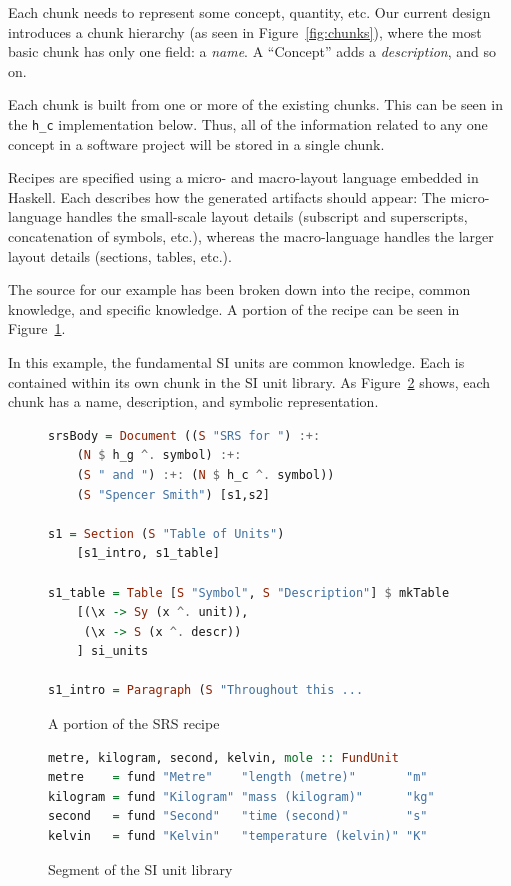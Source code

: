 \documentclass{sig-alternate-05-2015}
\begin{document}
Each chunk needs to represent some concept, quantity, etc. Our current design
introduces a chunk hierarchy (as seen in Figure~\ref{fig:chunks}), where the
most basic chunk has only one field: a \textit{name}. A ``Concept'' adds a
\textit{description}, and so on.

Each chunk is built from one or more of the existing chunks. This can be seen in
the \verb|h_c| implementation below. Thus, all of the information related to any
one concept in a software project will be stored in a single chunk.

Recipes are specified using a micro- and macro-layout language embedded in
Haskell. Each describes how the generated artifacts should appear: The
micro-language handles the small-scale layout details (subscript and
superscripts, concatenation of symbols, etc.), whereas the macro-language
handles the larger layout details (sections, tables, etc.).

The source for our example has been broken down into the recipe, common
knowledge, and specific knowledge. A portion of the recipe can be seen in
Figure~\ref{fig:recipe}.

In this example, the fundamental SI units are common knowledge. Each is
contained within its own chunk in the SI unit library. As
Figure~\ref{fig:know_common} shows, each chunk has a name, description, and
symbolic representation.

\begin{figure}
\begin{lstlisting}[language=Haskell, frame=single, showstringspaces=false, basicstyle=\tiny]
srsBody = Document ((S "SRS for ") :+: 
    (N $ h_g ^. symbol) :+: 
    (S " and ") :+: (N $ h_c ^. symbol)) 
    (S "Spencer Smith") [s1,s2]

s1 = Section (S "Table of Units") 
    [s1_intro, s1_table]

s1_table = Table [S "Symbol", S "Description"] $ mkTable
    [(\x -> Sy (x ^. unit)),
     (\x -> S (x ^. descr))
    ] si_units

s1_intro = Paragraph (S "Throughout this ...
\end{lstlisting}
\caption{A portion of the SRS recipe}
\label{fig:recipe}
\end{figure}

\begin{figure}
\begin{lstlisting}[language=Haskell, frame=single, showstringspaces=false, basicstyle=\tiny]
metre, kilogram, second, kelvin, mole :: FundUnit
metre    = fund "Metre"    "length (metre)"       "m"
kilogram = fund "Kilogram" "mass (kilogram)"      "kg"
second   = fund "Second"   "time (second)"        "s"
kelvin   = fund "Kelvin"   "temperature (kelvin)" "K"
\end{lstlisting}
\caption{Segment of the SI unit library}
\label{fig:know_common}
\end{figure}
\end{document}
